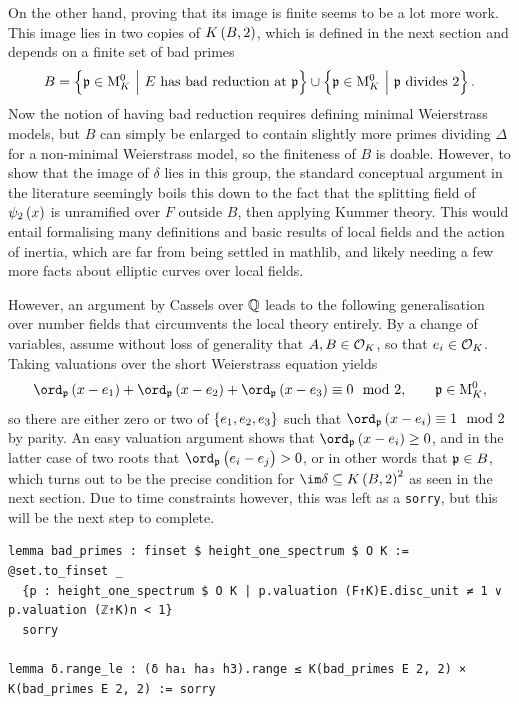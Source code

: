On the other hand, proving that its image is finite seems to be a lot more work. This image lies in two copies of $ K\br{B, 2} $, which is defined in the next section and depends on a finite set of bad primes
$$ B = \cbr{\ppp \in \M_K^0 \st E \ \text{has bad reduction at} \ \ppp} \cup \cbr{\ppp \in \M_K^0 \st \ppp \ \text{divides} \ 2}. $$
Now the notion of having bad reduction requires defining minimal Weierstrass models, but $ B $ can simply be enlarged to contain slightly more primes dividing $ \Delta $ for a non-minimal Weierstrass model, so the finiteness of $ B $ is doable. However, to show that the image of $ \delta $ lies in this group, the standard conceptual argument in the literature \cite[Proposition X.1.1]{Sil09} seemingly boils this down to the fact that the splitting field of $ \psi_2\br{x} $ is unramified over $ F $ outside $ B $, then applying Kummer theory. This would entail formalising many definitions and basic results of local fields and the action of inertia, which are far from being settled in mathlib, and likely needing a few more facts about elliptic curves over local fields.

\pagebreak

However, an argument by Cassels over $ \mathbb{Q} $ \cite[Theorem 15.1]{Cas91} leads to the following generalisation over number fields that circumvents the local theory entirely. By a change of variables, assume without loss of generality that $ A, B \in \mathcal{O}_K $, so that $ e_i \in \mathcal{O}_K $. Taking valuations over the short Weierstrass equation yields
$$ \ord_\ppp \br{x - e_1} + \ord_\ppp \br{x - e_2} + \ord_\ppp \br{x - e_3} \equiv 0 \mod 2, \qquad \ppp \in \M_K^0, $$
so there are either zero or two of $ \cbr{e_1, e_2, e_3} $ such that $ \ord_\ppp \br{x - e_i} \equiv 1 \mod 2 $ by parity. An easy valuation argument shows that $ \ord_\ppp \br{x - e_i} \ge 0 $, and in the latter case of two roots that $ \ord_\ppp \br{e_i - e_j} > 0 $, or in other words that $ \mathfrak{p} \in B $, which turns out to be the precise condition for $ \im \delta \subseteq K\br{B, 2}^2 $ as seen in the next section. Due to time constraints however, this was left as a \texttt{sorry}, but this will be the next step to complete.

\begin{lstlisting}[frame=single]
lemma bad_primes : finset $ height_one_spectrum $ O K :=
@set.to_finset _
  {p : height_one_spectrum $ O K | p.valuation (F↑K)E.disc_unit ≠ 1 ∨ p.valuation (ℤ↑K)n < 1}
  sorry

lemma δ.range_le : (δ ha₁ ha₃ h3).range ≤ K(bad_primes E 2, 2) × K(bad_primes E 2, 2) := sorry
\end{lstlisting}

